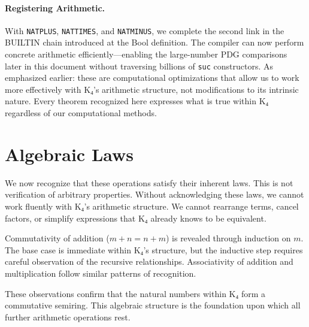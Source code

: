 \documentclass[11pt,a4paper]{book}
\begin{document}
\paragraph{Registering Arithmetic.}
With \texttt{NATPLUS}, \texttt{NATTIMES}, and \texttt{NATMINUS}, we complete the second link in the BUILTIN chain introduced at the Bool definition. The compiler can now perform concrete arithmetic efficiently—enabling the large-number PDG comparisons later in this document without traversing billions of \texttt{suc} constructors. As emphasized earlier: these are computational optimizations that allow us to work more effectively with K₄'s arithmetic structure, not modifications to its intrinsic nature. Every theorem recognized here expresses what is true within K₄ regardless of our computational methods.

\section{Algebraic Laws}

We now recognize that these operations satisfy their inherent laws. This is not verification of arbitrary properties. Without acknowledging these laws, we cannot work fluently with K₄'s arithmetic structure. We cannot rearrange terms, cancel factors, or simplify expressions that K₄ already knows to be equivalent.

Commutativity of addition ($m + n = n + m$) is revealed through induction on $m$. The base case is immediate within K₄'s structure, but the inductive step requires careful observation of the recursive relationships. Associativity of addition and multiplication follow similar patterns of recognition.

These observations confirm that the natural numbers within K₄ form a commutative semiring. This algebraic structure is the foundation upon which all further arithmetic operations rest.
\end{document}
